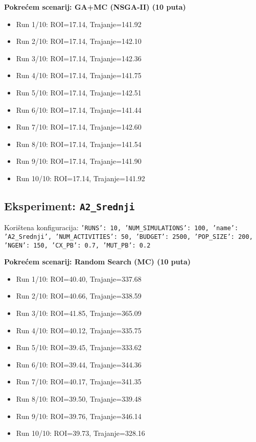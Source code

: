 \textbf{Pokrećem scenarij: GA+MC (NSGA-II) (10 puta)}
\begin{itemize}
    \item Run 1/10: ROI=17.14, Trajanje=141.92
    \item Run 2/10: ROI=17.14, Trajanje=142.10
    \item Run 3/10: ROI=17.14, Trajanje=142.36
    \item Run 4/10: ROI=17.14, Trajanje=141.75
    \item Run 5/10: ROI=17.14, Trajanje=142.51
    \item Run 6/10: ROI=17.14, Trajanje=141.44
    \item Run 7/10: ROI=17.14, Trajanje=142.60
    \item Run 8/10: ROI=17.14, Trajanje=141.54
    \item Run 9/10: ROI=17.14, Trajanje=141.90
    \item Run 10/10: ROI=17.14, Trajanje=141.92
\end{itemize}

\subsection*{Eksperiment: \texttt{A2\_Srednji}}
Korištena konfiguracija: \texttt{'RUNS': 10, 'NUM\_SIMULATIONS': 100, 'name': 'A2\_Srednji', 'NUM\_ACTIVITIES': 50, 'BUDGET': 2500, 'POP\_SIZE': 200, 'NGEN': 150, 'CX\_PB': 0.7, 'MUT\_PB': 0.2}

\textbf{Pokrećem scenarij: Random Search (MC) (10 puta)}
\begin{itemize}
    \item Run 1/10: ROI=40.40, Trajanje=337.68
    \item Run 2/10: ROI=40.66, Trajanje=338.59
    \item Run 3/10: ROI=41.85, Trajanje=365.09
    \item Run 4/10: ROI=40.12, Trajanje=335.75
    \item Run 5/10: ROI=39.45, Trajanje=333.62
    \item Run 6/10: ROI=39.44, Trajanje=344.36
    \item Run 7/10: ROI=40.17, Trajanje=341.35
    \item Run 8/10: ROI=39.50, Trajanje=339.48
    \item Run 9/10: ROI=39.76, Trajanje=346.14
    \item Run 10/10: ROI=39.73, Trajanje=328.16
\end{itemize}

